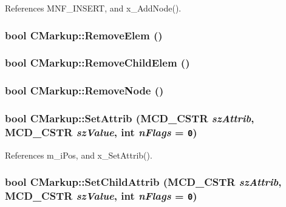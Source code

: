 References MNF\_\-INSERT, and x\_\-AddNode().
\subsubsection[RemoveElem]{\setlength{\rightskip}{0pt plus 5cm}bool CMarkup::RemoveElem ()}\label{classCMarkup_e2184e5dbf2aaf056aaad6a3690e2963}


\subsubsection[RemoveChildElem]{\setlength{\rightskip}{0pt plus 5cm}bool CMarkup::RemoveChildElem ()}\label{classCMarkup_7f1b54d8bcb5c68cf823835c98d41ae9}


\subsubsection[RemoveNode]{\setlength{\rightskip}{0pt plus 5cm}bool CMarkup::RemoveNode ()}\label{classCMarkup_521a5dc4f62c9535a45cfc5a765df1e7}


\subsubsection[SetAttrib]{\setlength{\rightskip}{0pt plus 5cm}bool CMarkup::SetAttrib ({\bf MCD\_\-CSTR} {\em szAttrib}, \/  {\bf MCD\_\-CSTR} {\em szValue}, \/  int {\em nFlags} = {\tt 0})\hspace{0.3cm}{\tt  [inline]}}\label{classCMarkup_e358f67c104c9b02e93a8a33cd81093f}




References m\_\-iPos, and x\_\-SetAttrib().
\subsubsection[SetChildAttrib]{\setlength{\rightskip}{0pt plus 5cm}bool CMarkup::SetChildAttrib ({\bf MCD\_\-CSTR} {\em szAttrib}, \/  {\bf MCD\_\-CSTR} {\em szValue}, \/  int {\em nFlags} = {\tt 0})\hspace{0.3cm}{\tt  [inline]}}\label{classCMarkup_054134023f97323604f77feefb3ab8b4}




